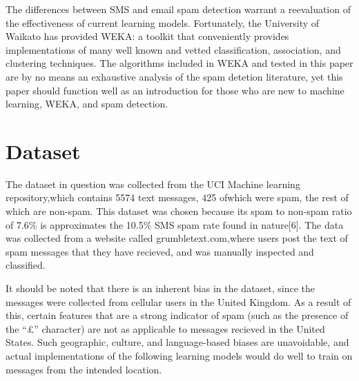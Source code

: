\documentclass[letterpaper, 10 pt, conference]{ieeeconf}  %
\begin{document}
The differences between SMS and email spam detection warrant a
reevaluation of the effectiveness of current learning
models. Fortunately, the University of Waikato has provided WEKA: a
toolkit that conveniently provides implementations of many well known
and vetted classification, association, and clustering techniques. The
algorithms included in WEKA and tested in this paper are by no means
an exhaustive analysis of the spam detetion literature, yet this paper
should function well as an introduction for those who are new to
machine learning, WEKA, and spam detection.

\section{Dataset}
The dataset in question was collected from the UCI Machine learning
repository,which contains 5574 text messages, 425 ofwhich were spam,
the rest of which are non-spam. This dataset was chosen because its
spam to non-spam ratio of 7.6\% is approximates the 10.5\% SMS spam
rate found in nature[6]. The data was collected from a website
called grumbletext.com,where users post the text of spam messages that
they have recieved, and was manually inspected and classified.

It should be noted that there is an inherent bias in the dataset,
since the messages were collected from cellular users in the United
Kingdom. As a result of this, certain features that are a strong
indicator of spam (such as the presence of the ``£'' character) are
not as applicable to messages recieved in the United States. Such
geographic, culture, and language-based biases are unavoidable, and
actual implementations of the following learning models would do well
to train on messages from the intended location.
\end{document}
